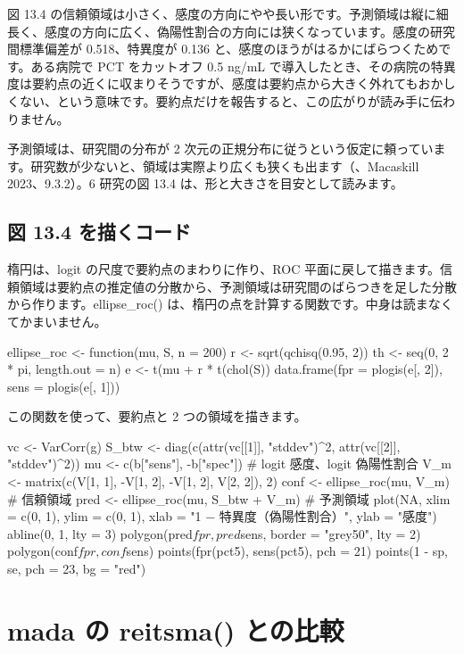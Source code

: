 図 13.4 の信頼領域は小さく、感度の方向にやや長い形です。予測領域は縦に細長く、感度の方向に広く、偽陽性割合の方向には狭くなっています。感度の研究間標準偏差が 0.518、特異度が 0.136 と、感度のほうがはるかにばらつくためです。ある病院で PCT をカットオフ 0.5 ng/mL で導入したとき、その病院の特異度は要約点の近くに収まりそうですが、感度は要約点から大きく外れてもおかしくない、という意味です。要約点だけを報告すると、この広がりが読み手に伝わりません。

予測領域は、研究間の分布が 2 次元の正規分布に従うという仮定に頼っています。研究数が少ないと、領域は実際より広くも狭くも出ます（、Macaskill 2023、9.3.2）。6 研究の図 13.4 は、形と大きさを目安として読みます。

\subsection{\hatten 図 13.4 を描くコード}
\label{sec:13-6-1}

楕円は、logit の尺度で要約点のまわりに作り、ROC 平面に戻して描きます。信頼領域は要約点の推定値の分散から、予測領域は研究間のばらつきを足した分散から作ります。ellipse\_roc() は、楕円の点を計算する関数です。中身は読まなくてかまいません。

\begin{rcode}
ellipse_roc <- function(mu, S, n = 200) {
  r <- sqrt(qchisq(0.95, 2))
  th <- seq(0, 2 * pi, length.out = n)
  e <- t(mu + r * t(chol(S)) %
  data.frame(fpr = plogis(e[, 2]), sens = plogis(e[, 1]))
}
\end{rcode}

この関数を使って、要約点と 2 つの領域を描きます。

\begin{rcode}
vc <- VarCorr(g)
S_btw <- diag(c(attr(vc[[1]], "stddev")^2,
                attr(vc[[2]], "stddev")^2))
mu <- c(b["sens"], -b["spec"])  # logit 感度、logit 偽陽性割合
V_m <- matrix(c(V[1, 1], -V[1, 2], -V[1, 2], V[2, 2]), 2)
conf <- ellipse_roc(mu, V_m)           # 信頼領域
pred <- ellipse_roc(mu, S_btw + V_m)   # 予測領域
plot(NA, xlim = c(0, 1), ylim = c(0, 1),
     xlab = "1 − 特異度（偽陽性割合）", ylab = "感度")
abline(0, 1, lty = 3)
polygon(pred$fpr, pred$sens, border = "grey50", lty = 2)
polygon(conf$fpr, conf$sens)
points(fpr(pct5), sens(pct5), pch = 21)
points(1 - sp, se, pch = 23, bg = "red")
\end{rcode}

\section{\hatten mada の reitsma() との比較}
\label{sec:13-7}

